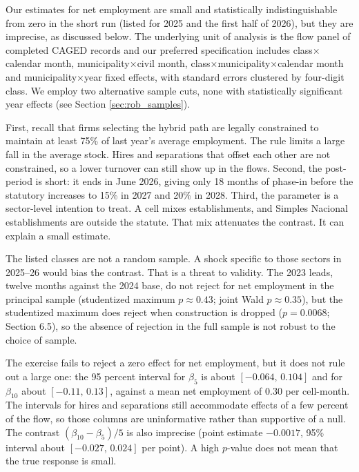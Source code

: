 \documentclass[12pt,a4paper]{article}
\begin{document}
Our estimates for net employment are small and statistically indistinguishable from zero in the short run (listed for 2025 and the first half of 2026), but they are imprecise, as discussed below. The underlying unit of analysis is the flow panel of completed CAGED records and our preferred specification includes class$\times$calendar month, municipality$\times$civil month, class$\times$municipality$\times$calendar month and municipality$\times$year fixed effects, with standard errors clustered by four-digit class. We employ two alternative sample cuts, none with statistically significant year effects (see Section \ref{sec:rob_samples}).

First, recall that firms selecting the hybrid path are legally constrained to maintain at least 75\% of last year's average employment. The rule limits a large fall in the average stock. Hires and separations that offset each other are not constrained, so a lower turnover can still show up in the flows. Second, the post-period is short: it ends in June 2026, giving only 18 months of phase-in before the statutory increases to 15\% in 2027 and 20\% in 2028. Third, the parameter is a sector-level intention to treat. A cell mixes establishments, and Simples Nacional establishments are outside the statute. That mix attenuates the contrast. It can explain a small estimate.

The listed classes are not a random sample. A shock specific to those sectors in 2025--26 would bias the contrast. That is a threat to validity. The 2023 leads, twelve months against the 2024 base, do not reject for net employment in the principal sample (studentized maximum $p\approx0.43$; joint Wald $p\approx0.35$), but the studentized maximum does reject when construction is dropped ($p=0.0068$; Section 6.5), so the absence of rejection in the full sample is not robust to the choice of sample.

The exercise fails to reject a zero effect for net employment, but it does not rule out a large one: the 95 percent interval for $\beta_5$ is about $[-0.064,\,0.104]$ and for $\beta_{10}$ about $[-0.11,\,0.13]$, against a mean net employment of 0.30 per cell-month. The intervals for hires and separations still accommodate effects of a few percent of the flow, so those columns are uninformative rather than supportive of a null. The contrast $(\beta_{10}-\beta_5)/5$ is also imprecise (point estimate $-0.0017$, 95\% interval about $[-0.027,\,0.024]$ per point). A high $p$-value does not mean that the true response is small.
\end{document}

